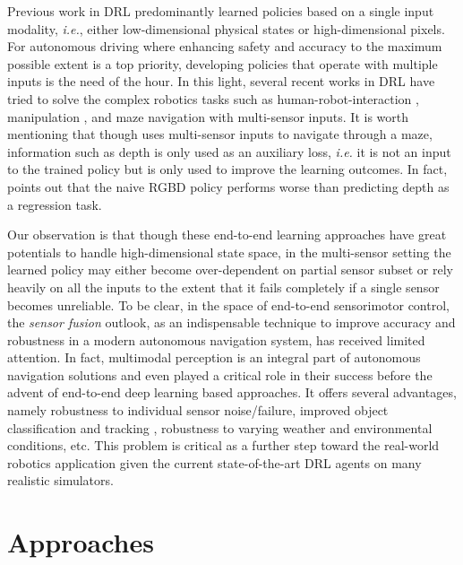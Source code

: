 \documentclass[../thesis.tex]{subfiles}
\begin{document}
 
Previous work in DRL predominantly learned policies based on a single input modality, \textit{i.e.}, either low-dimensional physical states or high-dimensional pixels. 
For autonomous driving where enhancing safety and accuracy to the maximum possible extent is a top priority, developing policies that operate with multiple inputs is the need of the hour. 
In this light, several recent works in DRL have tried to solve the complex robotics tasks such as human-robot-interaction \cite{qureshi2016robot}, manipulation \cite{levine2016end}, and maze navigation \cite{mirowski2017a} with multi-sensor inputs. 
It is worth mentioning that though \citet{mirowski2017a} uses multi-sensor inputs to navigate through a maze, information such as depth is only used as an auxiliary loss, \textit{i.e.} it is not an input to the trained policy but is only used to improve the learning outcomes. 
In fact, \citet{mirowski2017a} points out that the naive RGBD policy performs worse than predicting depth as a regression task.

Our observation is that though these end-to-end learning approaches have great potentials to handle high-dimensional state space, in the multi-sensor setting the learned policy may either become over-dependent on partial sensor subset or rely heavily on all the inputs to the extent that it fails completely if a single sensor becomes unreliable.
To be clear, in the space of end-to-end sensorimotor control, the \textit{sensor fusion} outlook, as an indispensable technique to improve accuracy and robustness in a modern autonomous navigation system, has received limited attention. 
In fact, multimodal perception is an integral part of autonomous navigation solutions and even played a critical role in their success \cite{multimodaltartan} before the advent of end-to-end deep learning based approaches. 
It offers several advantages, namely robustness to individual sensor noise/failure, improved object classification and tracking \cite{elfring2016multisensor, cho2014multi, darms2008classification}, robustness to varying weather and environmental conditions, etc. 
This problem is critical as a further step toward the real-world robotics application given the current state-of-the-art DRL agents on many realistic simulators.

 

 
 
\section{Approaches}
 
\end{document}
